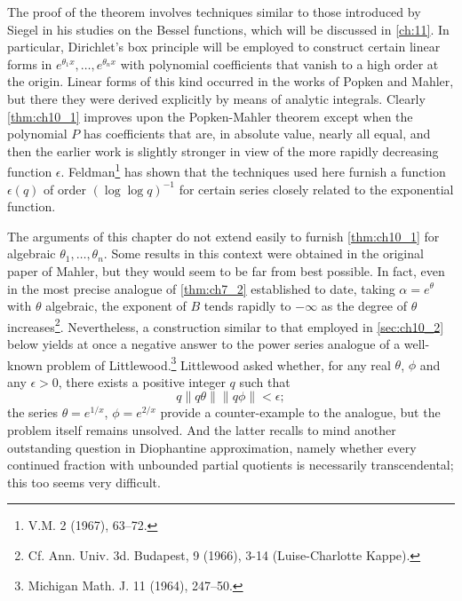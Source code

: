 The proof of the theorem involves techniques similar to those introduced by Siegel in his studies on the Bessel functions, which will be discussed in \autoref{ch:11}. In particular, Dirichlet's box principle will be employed to construct certain linear forms in $e^{\theta_1 x}, \ldots, e^{\theta_n x}$ with polynomial coefficients that vanish to a high order at the origin. Linear forms of this kind occurred in the works of Popken and Mahler, but there they were derived explicitly by means of analytic integrals. Clearly \autoref{thm:ch10_1} improves upon the Popken-Mahler theorem except when the polynomial $P$ has coefficients that are, in absolute value, nearly all equal, and then the earlier work is slightly stronger in view of the more rapidly decreasing function $\epsilon$. Feldman\footnote{V.M. 2 (1967), 63--72.} has shown that the techniques used here furnish a function $\epsilon(q)$ of order $(\log \log q)^{-1}$ for certain series closely related to the exponential function.

The arguments of this chapter do not extend easily to furnish \autoref{thm:ch10_1} for algebraic $\theta_1, \dots, \theta_n$. Some results in this context were obtained in the original paper of Mahler, but they would seem to be far from best possible. In fact, even in the most precise analogue of \autoref{thm:ch7_2} established to date, taking $\alpha = e^{\theta}$ with $\theta$ algebraic, the exponent of $B$ tends rapidly to $-\infty$ as the degree of $\theta$ increases\footnote{ Cf. Ann. Univ. 3d. Budapest, 9 (1966), 3-14 (Luise-Charlotte Kappe).}. Nevertheless, a construction similar to that employed in \autoref{sec:ch10_2} below yields at once a negative answer to the power series analogue of a well-known problem of Littlewood.\footnote{Michigan Math. J. 11 (1964), 247--50.} Littlewood asked whether, for any real $\theta$, $\phi$ and any $\epsilon > 0$, there exists a positive integer $q$ such that
\[q\|q\theta\|\|q\phi\|<\epsilon;\]
the series $\theta = e^{1/x}$, $\phi = e^{2/x}$ provide a counter-example to the analogue, but the problem itself remains unsolved. And the latter recalls to mind another outstanding question in Diophantine approximation, namely whether every continued fraction with unbounded partial quotients is necessarily transcendental; this too seems very difficult.

